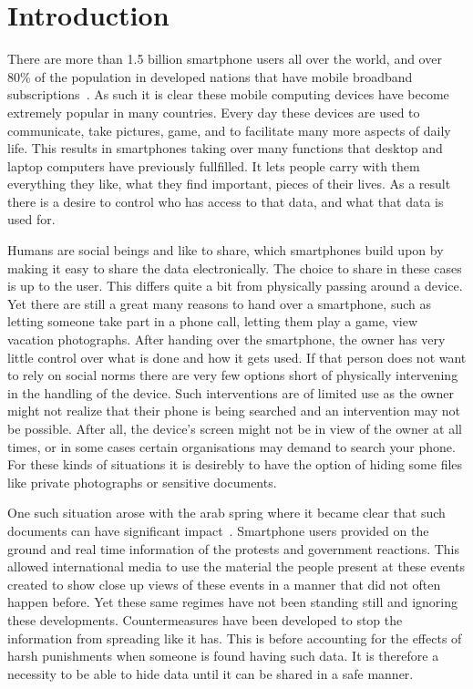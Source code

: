 \section{Introduction}
\label{sec:introduction}
There are more than 1.5 billion smartphone users all over the world\cite{smartphoneUsage}, and over 80\% of the population in developed nations that have mobile broadband subscriptions~\cite{mobileBroadband}.
As such it is clear these mobile computing devices have become extremely popular in many countries.
Every day these devices are used to communicate, take pictures, game, and to facilitate many more aspects of daily life.
This results in smartphones taking over many functions that desktop and laptop computers have previously fullfilled.
It lets people carry with them everything they like, what they find important, pieces of their lives.
As a result there is a desire to control who has access to that data, and what that data is used for.

Humans are social beings and like to share, which smartphones build upon by making it easy to share the data electronically.
The choice to share in these cases is up to the user. 
This differs quite a bit from physically passing around a device.
Yet there are still a great many reasons to hand over a smartphone, such as letting someone take part in a phone call, letting them play a game, view vacation photographs.
After handing over the smartphone, the owner has very little control over what is done and how it gets used.
If that person does not want to rely on social norms there are very few options short of physically intervening in the handling of the device.
Such interventions are of limited use as the owner might not realize that their phone is being searched and an intervention may not be possible.
After all, the device's screen might not be in view of the owner at all times, or in some cases certain organisations may demand to search your phone.
For these kinds of situations it is desirebly to have the option of hiding some files like private photographs or sensitive documents.

One such situation arose with the arab spring where it became clear that such documents can have significant impact~\cite{arabSpring}.
Smartphone users provided on the ground and real time information of the protests and government reactions.
This allowed international media to use the material the people present at these events created to show close up views of these events in a manner that did not often happen before.
Yet these same regimes have not been standing still and ignoring these developments.
Countermeasures have been developed to stop the information from spreading like it has\cite{cyberResponseGovernment}.
This is before accounting for the effects of harsh punishments when someone is found having such data.
It is therefore a necessity to be able to hide data until it can be shared in a safe manner.

